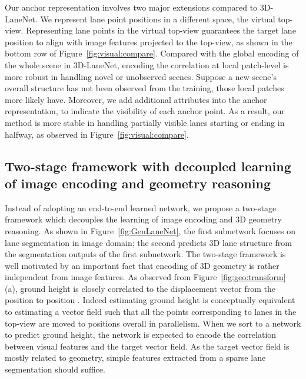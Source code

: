 \documentclass[10pt,twocolumn,letterpaper]{article}
\begin{document}
Our anchor representation involves two major extensions compared to 3D-LaneNet. We represent lane point positions in a different space, the virtual top-view. Representing lane points in the virtual top-view guarantees the target lane position to align with image features projected to the top-view, as shown in the bottom row of Figure~\ref{fig:visual:compare}. Compared with the global encoding of the whole scene in 3D-LaneNet, encoding the correlation at local patch-level is more robust in handling novel or unobserved scenes. Suppose a new scene's overall structure has not been observed from the training, those local patches more likely have. Moreover, we add additional attributes into the anchor representation, to indicate the visibility of each anchor point. As a result, our method is more stable in handling partially visible lanes starting or ending in halfway, as observed in Figure~\ref{fig:visual:compare}.









\subsection{Two-stage framework with decoupled learning of image encoding and geometry reasoning}
\label{sec:two:stage}


Instead of adopting an end-to-end learned network, we propose a two-stage framework which decouples the learning of image encoding and 3D geometry reasoning. As shown in Figure~\ref{fig:GenLaneNet}, the first subnetwork focuses on lane segmentation in image domain; the second predicts 3D lane structure from the segmentation outputs of the first subnetwork. The two-stage framework is well motivated by an important fact that encoding of 3D geometry is rather independent from image features. As observed from Figure~\ref{fig:geo:transform} (a), ground height  is closely correlated to the displacement vector from the position  to position . Indeed estimating ground height is conceptually equivalent to estimating a vector field such that all the points corresponding to lanes in the top-view are moved to positions overall in parallelism. When we sort to a network to predict ground height, the network is expected to encode the correlation between visual features and the target vector field. As the target vector field is mostly related to geometry, simple features extracted from a sparse lane segmentation should suffice. 
\end{document}
